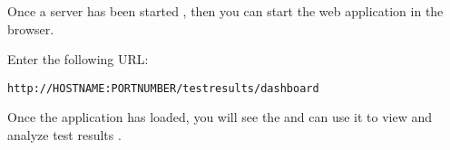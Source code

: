 Once a \dash{} server has been started , then you can start the web application in the browser. 

Enter the following URL:\\
\begin{verbatim}
http://HOSTNAME:PORTNUMBER/testresults/dashboard
\end{verbatim}

Once the application has loaded, you will see the \reportpersp{} and can use it to view and analyze test results .
